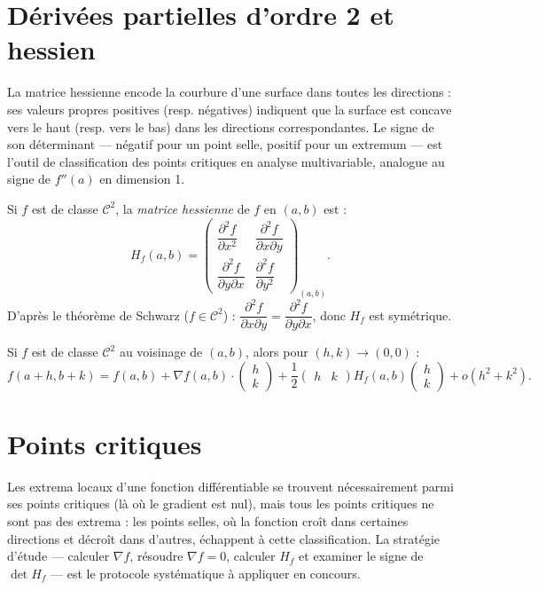 \documentclass[11pt,a4paper,twoside]{book}
\begin{document}
\section{Dérivées partielles d'ordre 2 et hessien}

La matrice hessienne encode la courbure d'une surface dans toutes les directions : ses valeurs propres positives (resp. négatives) indiquent que la surface est concave vers le haut (resp. vers le bas) dans les directions correspondantes. Le signe de son déterminant — négatif pour un point selle, positif pour un extremum — est l'outil de classification des points critiques en analyse multivariable, analogue au signe de $f''(a)$ en dimension 1.

\begin{definitionbox}
Si $f$ est de classe $\mathcal{C}^2$, la \emph{matrice hessienne} de $f$ en $(a,b)$ est :
\[
  H_f(a,b) = \begin{pmatrix}
    \dfrac{\partial^2 f}{\partial x^2} & \dfrac{\partial^2 f}{\partial x \partial y} \\[8pt]
    \dfrac{\partial^2 f}{\partial y \partial x} & \dfrac{\partial^2 f}{\partial y^2}
  \end{pmatrix}_{(a,b)}.
\]
D'après le théorème de Schwarz ($f \in \mathcal{C}^2$) :
$\dfrac{\partial^2 f}{\partial x \partial y} = \dfrac{\partial^2 f}{\partial y \partial x}$,
donc $H_f$ est symétrique.
\end{definitionbox}

\begin{theoremebox}
Si $f$ est de classe $\mathcal{C}^2$ au voisinage de $(a,b)$, alors pour $(h,k) \to (0,0)$ :
\[
  f(a+h,b+k) = f(a,b) + \nabla f(a,b) \cdot \begin{pmatrix}h\\k\end{pmatrix}
  + \frac{1}{2}\begin{pmatrix}h&k\end{pmatrix} H_f(a,b) \begin{pmatrix}h\\k\end{pmatrix}
  + o\!\left(h^2+k^2\right).
\]
\end{theoremebox}

\section{Points critiques}

Les extrema locaux d'une fonction différentiable se trouvent nécessairement parmi ses points critiques (là où le gradient est nul), mais tous les points critiques ne sont pas des extrema : les points selles, où la fonction croît dans certaines directions et décroît dans d'autres, échappent à cette classification. La stratégie d'étude — calculer $\nabla f$, résoudre $\nabla f = 0$, calculer $H_f$ et examiner le signe de $\det H_f$ — est le protocole systématique à appliquer en concours.
\end{document}
